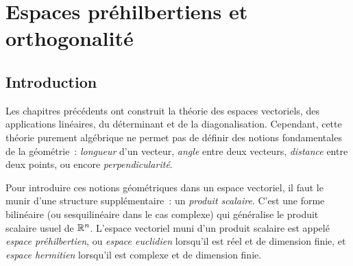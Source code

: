 
\chapter{Espaces préhilbertiens et orthogonalité}\label{ch:produits-scalaires}

\section*{Introduction}

Les chapitres précédents ont construit la théorie des espaces vectoriels,
des applications linéaires, du déterminant et de la diagonalisation.
Cependant, cette théorie purement algébrique ne permet pas de définir des
notions fondamentales de la géométrie~: \emph{longueur} d'un vecteur,
\emph{angle} entre deux vecteurs, \emph{distance} entre deux points,
ou encore \emph{perpendicularité}.

\medskip

Pour introduire ces notions géométriques dans un espace vectoriel, il
faut le munir d'une structure supplémentaire~: un \emph{produit
scalaire}. C'est une forme bilinéaire (ou
sesquilinéaire dans le cas complexe) qui généralise le produit scalaire
usuel de ${\mathbb{R}}^n$. L'espace vectoriel muni d'un produit scalaire est
appelé \emph{espace préhilbertien}, ou
\emph{espace euclidien} lorsqu'il est réel et de
dimension finie, et \emph{espace hermitien}
lorsqu'il est complexe et de dimension finie.

\medskip

